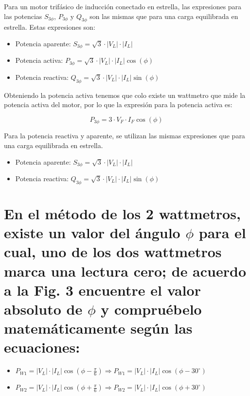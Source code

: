 \documentclass[12pt, letterpaper]{article}
\begin{document}
Para un motor trifásico de inducción conectado en estrella, las expresiones para las potencias \(S_{3 \phi}\), \(P_{3 \phi}\) y \(Q_{3 \phi}\) son las mismas que para una carga equilibrada en estrella. Estas expresiones son:

\begin{itemize}
	\item Potencia aparente:
	\(
	S_{3 \phi} = \sqrt{3} \cdot |V_{L}| \cdot |I_{L}|
	\)
	\item Potencia activa:
	\(
	P_{3 \phi} = \sqrt{3} \cdot |V_{L}| \cdot |I_{L}| \cos(\phi)
	\)
	\item Potencia reactiva:
	\(
	Q_{3 \phi} = \sqrt{3} \cdot |V_{L}| \cdot |I_{L}| \sin(\phi)
	\)
\end{itemize}

Obteniendo la potencia activa tenemos que colo existe un wattmetro que mide la potencia activa del motor, por lo que la expresión para la potencia activa es:

\[P_{3 \phi} = 3 \cdot V_{F} \cdot I_{F} \cos(\phi)\]

Para la potencia reactiva y aparente, se utilizan las mismas expresiones que para una carga equilibrada en estrella.

\begin{itemize}
	\item Potencia aparente:
	\(
	S_{3 \phi} = \sqrt{3} \cdot |V_{L}| \cdot |I_{L}|
	\)
	\item Potencia reactiva:
	\(
	Q_{3 \phi} = \sqrt{3} \cdot |V_{L}| \cdot |I_{L}| \sin(\phi)
	\)
\end{itemize}

\section{En el método de los 2 wattmetros, existe un valor del ángulo \(\phi\) para el cual, uno de los dos wattmetros marca una lectura cero; de acuerdo a la Fig. 3 encuentre el valor absoluto de \(\phi\) y compruébelo matemáticamente según las ecuaciones:}

\begin{itemize}
	\item \(P_{W1} = |V_{L}| \cdot |I_{L}| \cos \left(\phi - \frac{\pi}{6} \right) \Rightarrow P_{W1} = |V_{L}| \cdot |I_{L}| \cos \left(\phi - 30^{\circ} \right)\)
	\item \(P_{W2} = |V_{L}| \cdot |I_{L}| \cos \left(\phi + \frac{\pi}{6} \right) \Rightarrow P_{W2} = |V_{L}| \cdot |I_{L}| \cos \left(\phi + 30^{\circ} \right)\)
\end{itemize}
\end{document}
